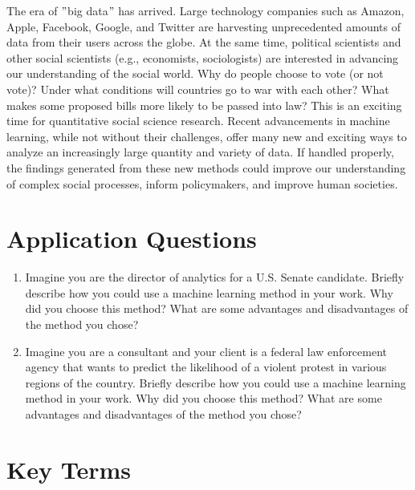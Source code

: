 \documentclass{book}
\begin{document}
The era of \("\)big data\("\) has arrived. Large technology companies such as
Amazon, Apple, Facebook, Google, and Twitter are harvesting unprecedented
amounts of data from their users across the globe. At the same time, political
scientists and other social scientists (e.g., economists, sociologists) are
interested in advancing our understanding of the social world. Why do people
choose to vote (or not vote)? Under what conditions will countries go to war
with each other? What makes some proposed bills more likely to be passed into
law? This is an exciting time for quantitative social science research. Recent
advancements in machine learning, while not without their challenges, offer
many new and exciting ways to analyze an increasingly large quantity and
variety of data. If handled properly, the findings generated from these new
methods could improve our understanding of complex social processes, inform
policymakers, and improve human societies.

\hypertarget{application-questions-9}{%
\section{Application Questions}\label{application-questions-9}}

\begin{enumerate}
\def\labelenumi{\arabic{enumi}.}
\item
  Imagine you are the director of analytics for a U.S. Senate candidate.
  Briefly describe how you could use a machine learning method in your work.
  Why did you choose this method? What are some advantages and disadvantages
  of the method you chose?
\item
  Imagine you are a consultant and your client is a federal law enforcement
  agency that wants to predict the likelihood of a violent protest in various
  regions of the country. Briefly describe how you could use a machine
  learning method in your work. Why did you choose this method? What are some
  advantages and disadvantages of the method you chose?
\end{enumerate}

\hypertarget{key-terms-7}{%
\section{Key Terms}\label{key-terms-7}}
\end{document}
